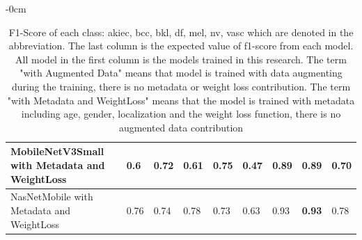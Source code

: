 \documentclass[sensors,article,submit,pdftex,moreauthors]{Definitions/mdpi}
\begin{document}
\begin{adjustwidth}{-\extralength}{0cm}
\begin{table}[H]
\begin{tabular}{|p{5cm} | p{0.6cm} | p{0.6cm} | p{0.6cm} | p{0.6cm} | p{0.6cm} | p{0.6cm} | p{0.6cm} | p{0.7cm}|}
		\hline
		MobileNetV3Small with Metadata and WeightLoss & 0.6 & 0.72 & 0.61 & 0.75 & 0.47 & 0.89 & \textbf{0.89} & 0.70\\
		\hline
		NasNetMobile with Metadata and WeightLoss & 0.76 & 0.74 & 0.78 & 0.73 & 0.63 & 0.93 & \textbf{0.93} & 0.78\\
		\hline
	\end{tabular}
	\caption{F1-Score of each class: akiec, bcc, bkl, df, mel, nv, vasc which are denoted in the abbreviation. The last column is the expected value of f1-score from each model. All model in the first column is the models trained in this research. The term "with Augmented Data" means that model is trained with data augmenting during the training, there is no metadata or weight loss contribution. The term "with Metadata and WeightLoss" means that the model is trained with metadata including age, gender, localization and the weight loss function, there is no augmented data contribution}
	\label{table:F1-score-summary}
\end{table}


\end{adjustwidth}
\end{document}
